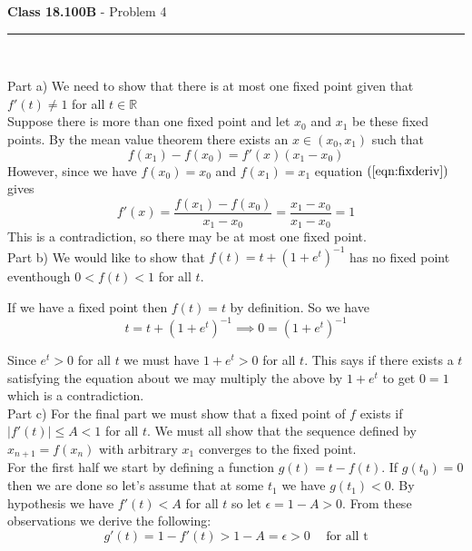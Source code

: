 \documentclass[11pt,reqno]{article}
\begin{document}
\vspace{15pt}
\begin{flushleft} 
\textbf{Class 18.100B} - Problem 4\\
\rule{500pt}{1pt}\\
\end{flushleft} 

\noindent Part a) We need to show that there is at most one fixed point given that $f'(t) \neq 1$ for all $t \in \mathbb{R}$\\
\indent  Suppose there is more than one fixed point and let $x_0$ and $x_1$ be these fixed points.  By the mean value theorem there exists an $x \in (x_0,x_1)$ such that 
\begin{equation}
 f(x_1) - f(x_0) = f'(x)(x_1-x_0) \label{eqn:fixderiv}
 \end{equation}
However, since we have $f(x_0) = x_0$ and $f(x_1) = x_1$ equation $(\ref{eqn:fixderiv})$ gives
\[ f'(x) = \frac{f(x_1)-f(x_0)}{x_1-x_0} = \frac{x_1-x_0}{x_1-x_0} = 1\]
This is a contradiction, so there may be at most one fixed point.\\

\noindent Part b) We would like to show that $f(t) = t + (1+e^t)^{-1}$ has no fixed point eventhough $0 < f(t) < 1$ for all $t$.

If we have a fixed point then $f(t) = t$ by definition. So we have
\begin{equation}
t = t + (1+e^t)^{-1} \implies 0 = (1+e^t)^{-1} 
\end{equation}

Since $e^t > 0$ for all $t$ we must have $1+e^t > 0$ for all $t$. This says if there exists a $t$ satisfying the equation about we may multiply the above by $1+e^t$ to get $0 = 1$ which is a contradiction.\\

Part c) For the final part we must show that a fixed point of $f$ exists if $|f'(t)| \le A < 1$ for all $t$. We must all show that the sequence defined by $x_{n+1} = f(x_n)$ with arbitrary $x_1$ converges to the fixed point.\\

For the first half we start by defining a function $g(t) = t - f(t)$. If $g(t_0) = 0$ then we are done so let's assume that at some $t_1$ we have $g(t_1) < 0 $. By hypothesis we have $f'(t) < A$ for all $t$ so let $\epsilon = 1 - A > 0$. From these observations we derive the following:
\begin{equation}
g'(t) = 1 - f'(t) > 1 - A = \epsilon > 0 \hspace{15pt} \text{for all t}\nonumber
\end{equation}
\end{document}
